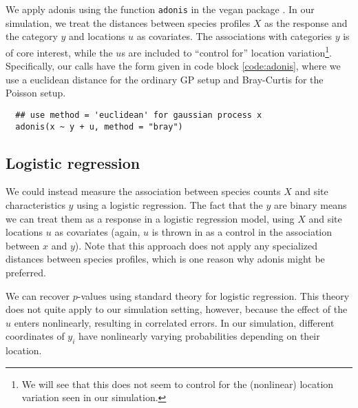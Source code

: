\documentclass{article}
\newenvironment{code}{\captionsetup{type=listing}}{}
\begin{document}


We apply adonis using the function \texttt{adonis} in the vegan package
\citep{oksanen2007vegan}. In our simulation, we treat the distances between
species profiles $X$ as the response and the category $y$ and locations $u$ as
covariates. The associations with categories $y$ is of core interest, while the
$u$s are included to ``control for'' location variation\footnote{We will see
  that this does not seem to control for the (nonlinear) location variation seen
  in our simulation.}. Specifically, our calls have the form given in code block
\ref{code:adonis}, where we use a euclidean distance for the ordinary GP setup
and Bray-Curtis for the Poisson setup.

\begin{code}
\begin{verbatim}
  ## use method = 'euclidean' for gaussian process x
  adonis(x ~ y + u, method = "bray")
\end{verbatim}
\label{code:adonis}
\end{code}

\subsection{Logistic regression}
\label{subsec:logistic_regression}

We could instead measure the association between species counts $X$ and site
characteristics $y$ using a logistic regression. The fact that the $y$ are
binary means we can treat them as a response in a logistic regression model,
using $X$ and site locations $u$ as covariates (again, $u$ is thrown in as a
control in the association between $x$ and $y$). Note that this approach does
not apply any specialized distances between species profiles, which is one
reason why adonis might be preferred.

We can recover $p$-values using standard theory for logistic regression. This
theory does not quite apply to our simulation setting, however, because the
effect of the $u$ enters nonlinearly, resulting in correlated errors. In our
simulation, different coordinates of $y_{i}$ have nonlinearly varying
probabilities depending on their location.
\end{document}
